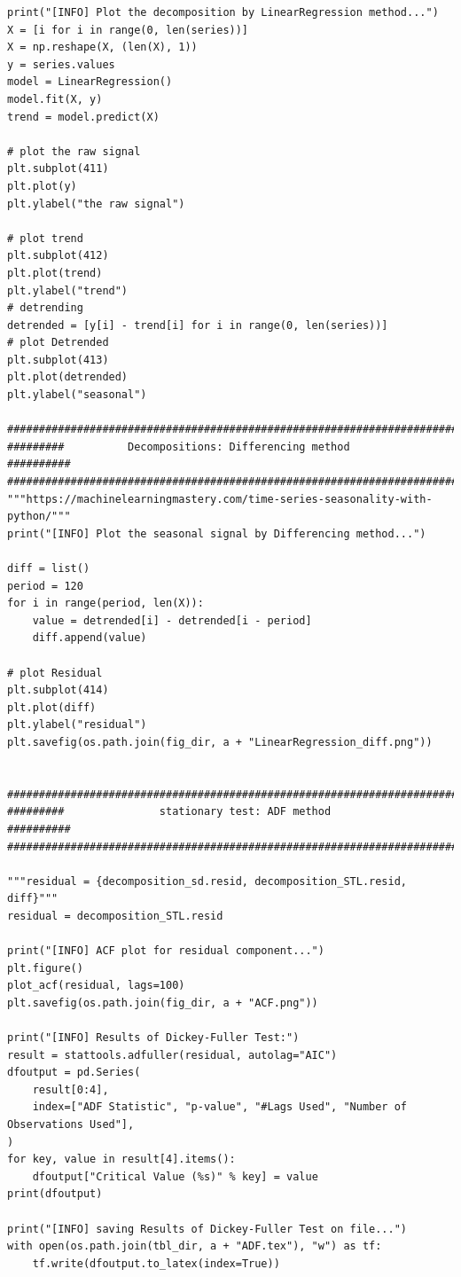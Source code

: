 \documentclass[12pt]{article}
\begin{document}
\begin{lstlisting}
print("[INFO] Plot the decomposition by LinearRegression method...")
X = [i for i in range(0, len(series))]
X = np.reshape(X, (len(X), 1))
y = series.values
model = LinearRegression()
model.fit(X, y)
trend = model.predict(X)

# plot the raw signal
plt.subplot(411)
plt.plot(y)
plt.ylabel("the raw signal")

# plot trend
plt.subplot(412)
plt.plot(trend)
plt.ylabel("trend")
# detrending
detrended = [y[i] - trend[i] for i in range(0, len(series))]
# plot Detrended
plt.subplot(413)
plt.plot(detrended)
plt.ylabel("seasonal")

############################################################################
#########          Decompositions: Differencing method            ##########
############################################################################
"""https://machinelearningmastery.com/time-series-seasonality-with-python/"""
print("[INFO] Plot the seasonal signal by Differencing method...")

diff = list()
period = 120
for i in range(period, len(X)):
    value = detrended[i] - detrended[i - period]
    diff.append(value)

# plot Residual
plt.subplot(414)
plt.plot(diff)
plt.ylabel("residual")
plt.savefig(os.path.join(fig_dir, a + "LinearRegression_diff.png"))


############################################################################
#########               stationary test: ADF method               ##########
############################################################################

"""residual = {decomposition_sd.resid, decomposition_STL.resid, diff}"""
residual = decomposition_STL.resid

print("[INFO] ACF plot for residual component...")
plt.figure()
plot_acf(residual, lags=100)
plt.savefig(os.path.join(fig_dir, a + "ACF.png"))

print("[INFO] Results of Dickey-Fuller Test:")
result = stattools.adfuller(residual, autolag="AIC")
dfoutput = pd.Series(
    result[0:4],
    index=["ADF Statistic", "p-value", "#Lags Used", "Number of Observations Used"],
)
for key, value in result[4].items():
    dfoutput["Critical Value (%s)" % key] = value
print(dfoutput)

print("[INFO] saving Results of Dickey-Fuller Test on file...")
with open(os.path.join(tbl_dir, a + "ADF.tex"), "w") as tf:
    tf.write(dfoutput.to_latex(index=True))



\end{lstlisting}
\end{document}
